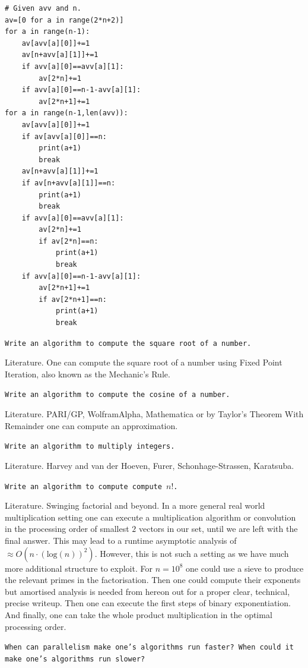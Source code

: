 \begin{verbatim}
# Given avv and n.
av=[0 for a in range(2*n+2)]
for a in range(n-1):
    av[avv[a][0]]+=1
    av[n+avv[a][1]]+=1
    if avv[a][0]==avv[a][1]:
        av[2*n]+=1
    if avv[a][0]==n-1-avv[a][1]:
        av[2*n+1]+=1
for a in range(n-1,len(avv)):
    av[avv[a][0]]+=1
    if av[avv[a][0]]==n:
        print(a+1)
        break
    av[n+avv[a][1]]+=1
    if av[n+avv[a][1]]==n:
        print(a+1)
        break
    if avv[a][0]==avv[a][1]:
        av[2*n]+=1
        if av[2*n]==n:
            print(a+1)
            break
    if avv[a][0]==n-1-avv[a][1]:
        av[2*n+1]+=1
        if av[2*n+1]==n:
            print(a+1)
            break
\end{verbatim}

\texttt{Write an algorithm to compute the square root of a number.}

Literature. One can compute the square root of a number using Fixed Point Iteration, also known as the Mechanic's Rule.

\texttt{Write an algorithm to compute the cosine of a number.}

Literature. PARI/GP, WolframAlpha, Mathematica or by Taylor's Theorem With Remainder one can compute an approximation.

\texttt{Write an algorithm to multiply integers.}

Literature. Harvey and van der Hoeven, Furer, Schonhage-Strassen, Karatsuba.

\texttt{Write an algorithm to compute compute $n!$.}

Literature. Swinging factorial and beyond. In a more general real world multiplication setting one can execute a multiplication algorithm or convolution in the processing order of smallest $2$ vectors in our set, until we are left with the final answer. This may lead to a runtime asymptotic analysis of $\approx O(n \cdot (\text{log}(n))^2)$. However, this is not such a setting as we have much more additional structure to exploit. For $n=10^8$ one could use a sieve to produce the relevant primes in the factorisation. Then one could compute their exponents but amortised analysis is needed from hereon out for a proper clear, technical, precise writeup. Then one can execute the first steps of binary exponentiation. And finally, one can take the whole product multiplication in the optimal processing order.

\texttt{When can parallelism make one's algorithms run faster? When could it make one's algorithms run slower?}

